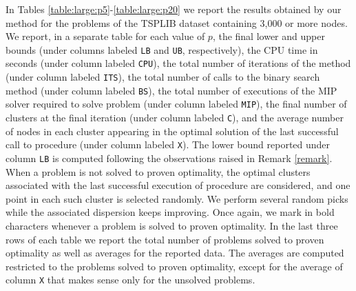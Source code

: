 \documentclass[ijoo,nonblindrev]{informs-ijoo}
\begin{document}
In Tables \ref{table:large:p5}-\ref{table:large:p20} we report the results obtained by our method for the problems of the TSPLIB dataset containing 3,000 or more nodes. We report, in a separate table for each value of $p$, the final lower and upper bounds (under columns labeled \texttt{LB} and \texttt{UB}, respectively), the CPU time in seconds (under column labeled \texttt{CPU}), the total number of iterations of the method (under column labeled \texttt{ITS}), the total number of calls to the binary search method (under column labeled \texttt{BS}), the total number of executions of the MIP solver required to solve problem  (under column labeled \texttt{MIP}), the final number of clusters at the final iteration (under column labeled \texttt{C}), and the average number of nodes in each cluster appearing in the optimal solution of the last successful call to procedure  (under column labeled \texttt{X}). The lower bound reported under column \texttt{LB} is computed following the observations raised in Remark \ref{remark}. When a problem is not solved to proven optimality, the optimal clusters associated with the last successful execution of procedure  are considered, and one point in each such cluster is selected randomly. We perform several random picks while the associated dispersion keeps improving. Once again, we mark in bold characters whenever a problem is solved to proven optimality. In the last three rows of each table we report the total number of problems solved to proven optimality as well as averages for the reported data. The averages are computed restricted to the problems solved to proven optimality, except for the average of column \texttt{X} that makes sense only for the unsolved problems. 
\end{document}
